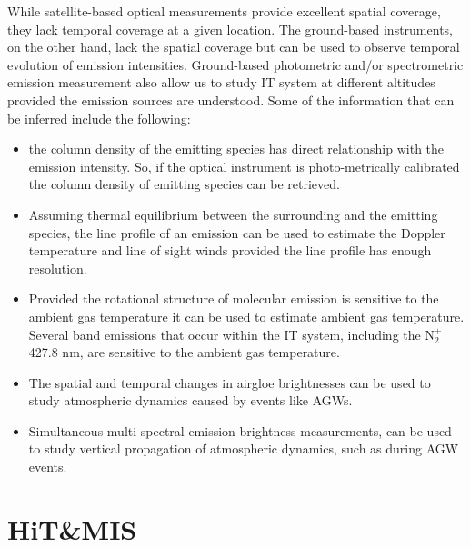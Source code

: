 \documentclass[crop=false,class=mitthesis,oneside,font=12pt]{standalone}
\begin{document}
While satellite-based optical measurements provide excellent spatial coverage, they lack temporal coverage at a given location. The ground-based instruments, on the other hand, lack the spatial coverage but can be used to observe temporal evolution of emission intensities. Ground-based photometric and/or spectrometric emission measurement also allow us to study IT system at different altitudes provided the emission sources are understood. Some of the information that can be inferred include the following:
\begin{itemize}
\item the column density of the emitting species has direct relationship with the emission intensity. So, if the optical instrument is photo-metrically calibrated the column density of emitting species can be retrieved.
\item Assuming thermal equilibrium between the surrounding and the emitting species, the line profile of an emission can be used to estimate the Doppler temperature and line of sight winds provided the line profile has enough resolution.
\item Provided the rotational structure of molecular emission is sensitive to the ambient gas temperature it can be used to estimate ambient gas temperature. Several band emissions that occur within the IT system, including the N$_2^+$ 427.8 nm, are sensitive to the ambient gas temperature.
\item The spatial and temporal changes in airgloe brightnesses can be used to study atmospheric dynamics caused by events like AGWs.
\item Simultaneous multi-spectral emission brightness measurements, can be used to study vertical propagation of atmospheric dynamics, such as during AGW events.

\end{itemize}

\section{HiT\&MIS}
\end{document}
